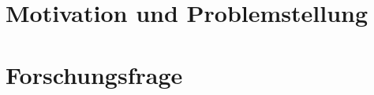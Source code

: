 \documentclass[
    paper=a4,
    bibtotocnumbered,
    liststotocnumbered,
    oneside,
    12pt,
    listof=totoc,
    toc=chapterentrywithdots,
    listof=entryprefix,
]{scrreprt}
\begin{document}

\chapter{Motivation und Problemstellung}


\chapter{Forschungsfrage}
\blindtext




\nocite{*}



% 
\end{document}
